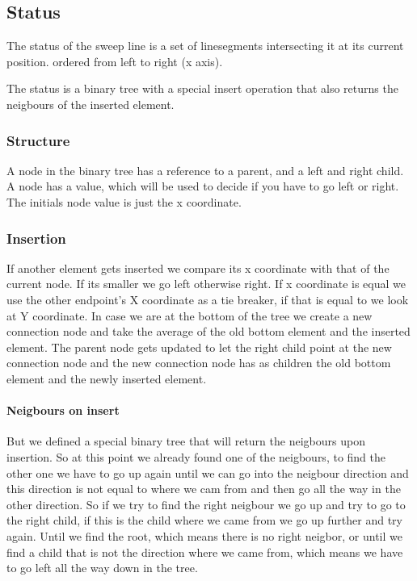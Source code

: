 \documentclass{article}
\begin{document}
\subsection{Status}
The status of the sweep line is a set of linesegments intersecting it at
its current position. ordered from left to right (x axis).

The status is a binary tree with a special insert operation that also
returns the neigbours of the inserted element.

\subsubsection{Structure}
A node in the binary tree has a reference to a parent, and a left and right child.
A node has a value, which will be used to decide if you have to go left or right.
The initials node value is just the x coordinate.

\subsubsection{Insertion}
If another element gets
inserted we compare its x coordinate with that of the current node. If its
smaller we go left otherwise right. If x coordinate is equal we use the other
endpoint's X coordinate as a tie breaker, if that is equal to we look at
Y coordinate.
In case we are at the bottom of the tree we create a new connection node
and take the average of the old bottom element and the inserted element.
The parent node gets updated to let the right child point at the new
connection node and the new connection node has as children the old bottom
element and the newly inserted element.

\paragraph{Neigbours on insert}
But we defined a special binary tree that will return the neigbours upon
insertion. So at this point we already found one of the neigbours, to find
the other one we have to go up again until we can go into the neigbour
direction and this direction is not equal to where we cam from and then go
all the way in the other direction.
So if we try to find the right neigbour we go up and try to go to the right
child, if this is the child where we came from we go up further and try again.
Until we find the root, which means there is no right neigbor, or until
we find a child that is not the direction where we came from, which means
we have to go left all the way down in the tree.
\end{document}
